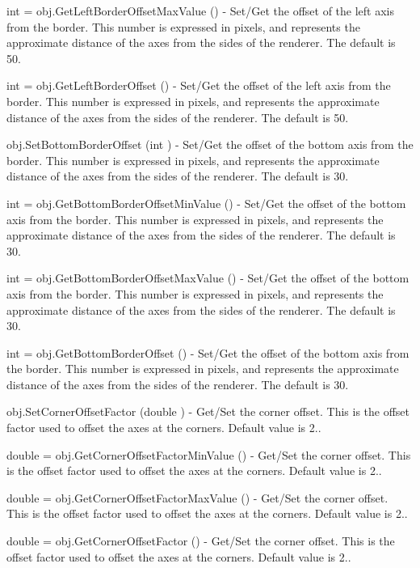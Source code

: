 \begin{DoxyItemize}
\item {\ttfamily int = obj.\-Get\-Left\-Border\-Offset\-Max\-Value ()} -\/ Set/\-Get the offset of the left axis from the border. This number is expressed in pixels, and represents the approximate distance of the axes from the sides of the renderer. The default is 50.  
\item {\ttfamily int = obj.\-Get\-Left\-Border\-Offset ()} -\/ Set/\-Get the offset of the left axis from the border. This number is expressed in pixels, and represents the approximate distance of the axes from the sides of the renderer. The default is 50.  
\item {\ttfamily obj.\-Set\-Bottom\-Border\-Offset (int )} -\/ Set/\-Get the offset of the bottom axis from the border. This number is expressed in pixels, and represents the approximate distance of the axes from the sides of the renderer. The default is 30.  
\item {\ttfamily int = obj.\-Get\-Bottom\-Border\-Offset\-Min\-Value ()} -\/ Set/\-Get the offset of the bottom axis from the border. This number is expressed in pixels, and represents the approximate distance of the axes from the sides of the renderer. The default is 30.  
\item {\ttfamily int = obj.\-Get\-Bottom\-Border\-Offset\-Max\-Value ()} -\/ Set/\-Get the offset of the bottom axis from the border. This number is expressed in pixels, and represents the approximate distance of the axes from the sides of the renderer. The default is 30.  
\item {\ttfamily int = obj.\-Get\-Bottom\-Border\-Offset ()} -\/ Set/\-Get the offset of the bottom axis from the border. This number is expressed in pixels, and represents the approximate distance of the axes from the sides of the renderer. The default is 30.  
\item {\ttfamily obj.\-Set\-Corner\-Offset\-Factor (double )} -\/ Get/\-Set the corner offset. This is the offset factor used to offset the axes at the corners. Default value is 2..  
\item {\ttfamily double = obj.\-Get\-Corner\-Offset\-Factor\-Min\-Value ()} -\/ Get/\-Set the corner offset. This is the offset factor used to offset the axes at the corners. Default value is 2..  
\item {\ttfamily double = obj.\-Get\-Corner\-Offset\-Factor\-Max\-Value ()} -\/ Get/\-Set the corner offset. This is the offset factor used to offset the axes at the corners. Default value is 2..  
\item {\ttfamily double = obj.\-Get\-Corner\-Offset\-Factor ()} -\/ Get/\-Set the corner offset. This is the offset factor used to offset the axes at the corners. Default value is 2..  

\end{DoxyItemize}
